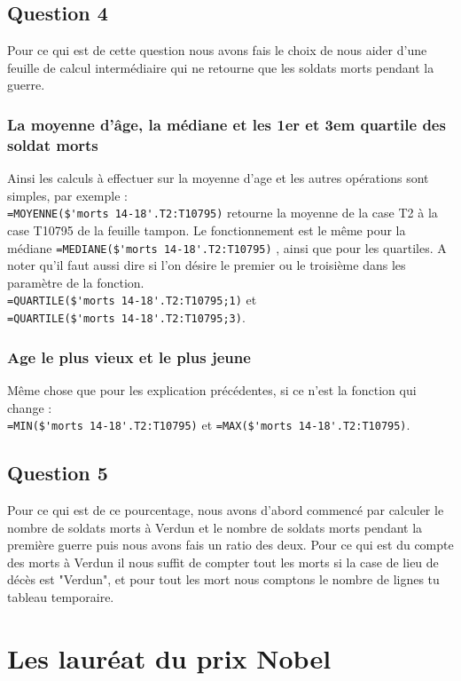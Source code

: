 \documentclass[10pt,a4paper]{article}
\begin{document}
\subsection{Question 4}
Pour ce qui est de cette question nous avons fais le choix de nous aider d'une feuille de calcul intermédiaire qui ne retourne que les soldats morts pendant la guerre. 
\subsubsection{La moyenne d'âge, la médiane et les 1er et 3em quartile des soldat morts}
Ainsi les calculs à effectuer sur la moyenne d'age et les autres opérations sont simples, par exemple : \\
\verb|=MOYENNE($'morts 14-18'.T2:T10795)| retourne la moyenne de la case T2 à la case T10795 de la feuille tampon. Le fonctionnement est le même pour la médiane \verb|=MEDIANE($'morts 14-18'.T2:T10795)| , ainsi que pour les quartiles. A noter qu'il faut aussi dire si l'on désire le premier ou le troisième dans les paramètre de la fonction. \\ 
\verb|=QUARTILE($'morts 14-18'.T2:T10795;1)| et \\ 
\verb|=QUARTILE($'morts 14-18'.T2:T10795;3)|.
\subsubsection{Age le plus vieux et le plus jeune}
Même chose que pour les explication précédentes, si ce n'est la fonction qui change : \\ \verb|=MIN($'morts 14-18'.T2:T10795)| et \verb|=MAX($'morts 14-18'.T2:T10795)|.
\subsection{Question 5}
Pour ce qui est de ce pourcentage, nous avons d'abord commencé par calculer le nombre de soldats morts à Verdun et le nombre de soldats morts pendant la première guerre puis nous avons fais un ratio des deux. Pour ce qui est du compte des morts à Verdun il nous suffit de compter tout les morts si la case de lieu de décès est "Verdun", et pour tout les mort nous comptons le nombre de lignes tu tableau temporaire. 

\section{Les lauréat du prix Nobel}
\end{document}
